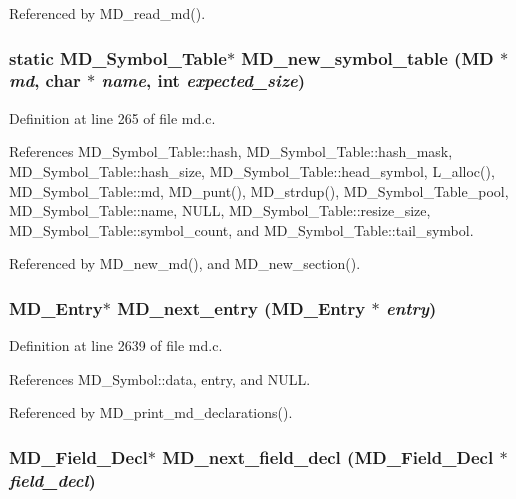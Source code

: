 Referenced by MD\_\-read\_\-md().
\subsubsection{\setlength{\rightskip}{0pt plus 5cm}static \bf{MD\_\-Symbol\_\-Table}$\ast$ MD\_\-new\_\-symbol\_\-table (\bf{MD} $\ast$ {\em md}, char $\ast$ {\em name}, int {\em expected\_\-size})\hspace{0.3cm}{\tt  [static]}}\label{md_8c_fb165a7d18c8049e73104b71e2d83075}




Definition at line 265 of file md.c.

References MD\_\-Symbol\_\-Table::hash, MD\_\-Symbol\_\-Table::hash\_\-mask, MD\_\-Symbol\_\-Table::hash\_\-size, MD\_\-Symbol\_\-Table::head\_\-symbol, L\_\-alloc(), MD\_\-Symbol\_\-Table::md, MD\_\-punt(), MD\_\-strdup(), MD\_\-Symbol\_\-Table\_\-pool, MD\_\-Symbol\_\-Table::name, NULL, MD\_\-Symbol\_\-Table::resize\_\-size, MD\_\-Symbol\_\-Table::symbol\_\-count, and MD\_\-Symbol\_\-Table::tail\_\-symbol.

Referenced by MD\_\-new\_\-md(), and MD\_\-new\_\-section().
\subsubsection{\setlength{\rightskip}{0pt plus 5cm}\bf{MD\_\-Entry}$\ast$ MD\_\-next\_\-entry (\bf{MD\_\-Entry} $\ast$ {\em entry})}\label{md_8c_f91910c190e1e376321633ee24e235c0}




Definition at line 2639 of file md.c.

References MD\_\-Symbol::data, entry, and NULL.

Referenced by MD\_\-print\_\-md\_\-declarations().
\subsubsection{\setlength{\rightskip}{0pt plus 5cm}\bf{MD\_\-Field\_\-Decl}$\ast$ MD\_\-next\_\-field\_\-decl (\bf{MD\_\-Field\_\-Decl} $\ast$ {\em field\_\-decl})}\label{md_8c_a1591f954c0b8b00c6a22356c02024ff}




